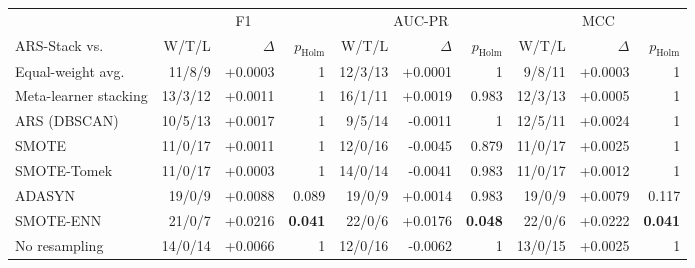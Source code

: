 \begin{tabular}{lrrrrrrrrr}
\toprule
 & \multicolumn{3}{c}{F1} & \multicolumn{3}{c}{AUC-PR} & \multicolumn{3}{c}{MCC} \\
\cmidrule(lr){2-4}\cmidrule(lr){5-7}\cmidrule(lr){8-10}
ARS-Stack vs. & W/T/L & $\Delta$ & $p_{\mathrm{Holm}}$ & W/T/L & $\Delta$ & $p_{\mathrm{Holm}}$ & W/T/L & $\Delta$ & $p_{\mathrm{Holm}}$ \\
\midrule
Equal-weight avg. & 11/8/9 & +0.0003 & 1 & 12/3/13 & +0.0001 & 1 & 9/8/11 & +0.0003 & 1 \\
Meta-learner stacking & 13/3/12 & +0.0011 & 1 & 16/1/11 & +0.0019 & 0.983 & 12/3/13 & +0.0005 & 1 \\
ARS (DBSCAN) & 10/5/13 & +0.0017 & 1 & 9/5/14 & -0.0011 & 1 & 12/5/11 & +0.0024 & 1 \\
SMOTE & 11/0/17 & +0.0011 & 1 & 12/0/16 & -0.0045 & 0.879 & 11/0/17 & +0.0025 & 1 \\
SMOTE-Tomek & 11/0/17 & +0.0003 & 1 & 14/0/14 & -0.0041 & 0.983 & 11/0/17 & +0.0012 & 1 \\
ADASYN & 19/0/9 & +0.0088 & 0.089 & 19/0/9 & +0.0014 & 0.983 & 19/0/9 & +0.0079 & 0.117 \\
SMOTE-ENN & 21/0/7 & +0.0216 & \textbf{0.041} & 22/0/6 & +0.0176 & \textbf{0.048} & 22/0/6 & +0.0222 & \textbf{0.041} \\
No resampling & 14/0/14 & +0.0066 & 1 & 12/0/16 & -0.0062 & 1 & 13/0/15 & +0.0025 & 1 \\
\bottomrule
\end{tabular}
